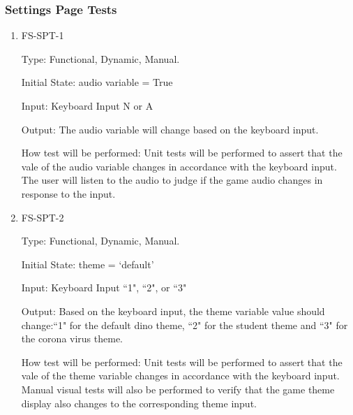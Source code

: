 \documentclass[12pt, titlepage]{article}
\begin{document}
\subsubsection{Settings Page Tests}
	
\begin{enumerate}

\item{FS-SPT-1\\}

Type: Functional, Dynamic, Manual.
					
Initial State: audio variable = True
					
Input: Keyboard Input N or A 
					
Output: The audio variable will change based on the keyboard input. 
					
How test will be performed: Unit tests will be performed to assert that the vale of the audio variable changes in accordance with the keyboard input. The user will listen to the audio to judge if the game audio changes in response to the input.


					
\item{FS-SPT-2\\}

Type: Functional, Dynamic, Manual.
					
Initial State: theme = `default'
					
Input: Keyboard Input ``1", ``2", or ``3"
					
Output: Based on the keyboard input, the theme variable value should change:``1" for the default dino theme, ``2" for the student theme and ``3" for the corona virus theme.
					
How test will be performed: Unit tests will be performed to assert that the vale of the theme variable changes in accordance with the keyboard input.
Manual visual tests will also be performed to verify that the game theme display also changes to the corresponding theme input.




\end{enumerate}
\end{document}
